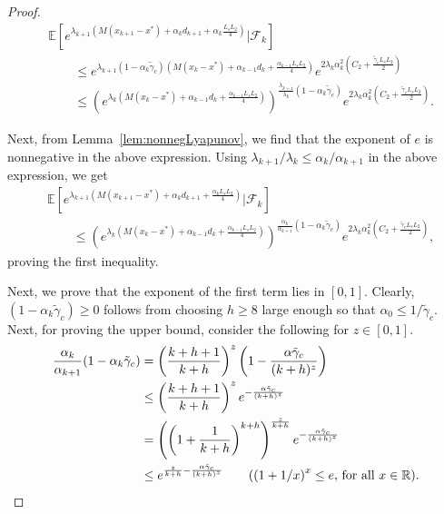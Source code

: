 \documentclass[10pt,a4paper]{amsart}
\newcommand{\E}[1]{\mathbb{E}\lrs{#1}}
\newcommand{\R}{\mathbb{R}}
\newcommand{\lrp}[1]{\left( #1 \right)}
\newcommand{\lrs}[1]{\left[ #1 \right]}
\newcommand{\numberthis}{\addtocounter{equation}{1}\tag{\theequation}}
\newcommand{\xk}{x_k}
\begin{document}
\begin{proof}
\begin{align*}
        &\E{ e^{\lambda_{k+1}\lrp{M(x_{k+1} - x^*) + \alpha_k d_{k+1} + \alpha_k \frac{L_s L_2}{4} }} \big| \mathcal F_k }\\
        &\qquad \le e^{ \lambda_{k+1}(1-\alpha_k \tilde{\gamma}_c)\lrp{M(\xk - x^*) + \alpha_{k-1}d_k + \frac{\alpha_{k-1} L_sL_2}{4} } }  e^{2 \lambda_k \alpha^2_k \lrp{C_2 + \frac{\tilde{\gamma}_c L_sL_2}{2} }}\\
        &\qquad \le \lrp{e^{ \lambda_{k}\lrp{ M(\xk - x^*) + \alpha_{k-1}d_k + \frac{\alpha_{k-1} L_sL_2}{4} }}}^{\frac{\lambda_{k+1}}{\lambda_k}(1-\alpha_k \tilde{\gamma}_c)}  e^{2 \lambda_k \alpha^2_k \lrp{C_2 + \frac{\tilde{\gamma}_c L_sL_2}{2} }}.
\end{align*}    

Next, from Lemma~\ref{lem:nonnegLyapunov}, we find that the exponent of $e$ is nonnegative in the above expression. Using $\lambda_{k+1}/\lambda_k \le \alpha_k/\alpha_{k+1}$ in the above expression, we get 
\begin{align*}
        &\E{ e^{\lambda_{k+1}\lrp{M(x_{k+1} - x^*) + \alpha_k d_{k+1} + \frac{\alpha_k L_sL_2 }{4 } }} \big| \mathcal F_k }\\
        &\qquad \le \lrp{e^{ \lambda_{k}\lrp{ M(\xk - x^*) + \alpha_{k-1}d_k + \frac{\alpha_{k-1} L_sL_2}{4}}}}^{\frac{\alpha_{k}}{\alpha_{k+1}}(1-\alpha_k \tilde{\gamma}_c)}  e^{2 \lambda_k \alpha^2_k \lrp{C_2 + \frac{\tilde{\gamma}_c L_sL_2}{2} }},%
\end{align*}
proving the first inequality.

Next, we prove that the exponent of the first term lies in $[0,1]$. Clearly, $(1-\alpha_k \tilde{\gamma}_c) \ge 0$ follows from choosing $h \ge 8$ large enough so that $\alpha_0 \le 1/\tilde{\gamma}_c$. Next, for proving the upper bound, consider the following for $z \in [0,1]$. 
\begin{align*}
    \frac{\alpha_k }{\alpha_{k+1}}(1-\alpha_k\tilde{\gamma}_c) 
    &= \lrp{\frac{k+h +1 }{k+h}}^z\lrp{1-\frac{\alpha \tilde{\gamma}_c}{(k+h)^z}}\\
    &\le \lrp{\frac{k+h+1}{k+h}}^ze^{-\frac{\alpha \tilde{\gamma}_c}{(k+h)^z}}\\
    &= \lrp{\lrp{1+\frac{1}{k+h}}^{k+h}}^\frac{z}{k+h} e^{-\frac{\alpha \tilde{\gamma}_c}{(k+h)^z}}\\
    &\le e^{ \frac{z}{k+h} - \frac{ \alpha \tilde{\gamma}_c}{(k+h)^z}} \tag{$\lrp{1+1/x}^x \le e$, for all $x \in \R$}.
\end{align*}


\end{proof}
\end{document}
